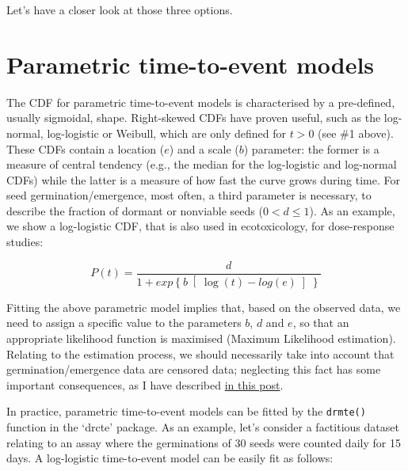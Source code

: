 \documentclass[
]{book}
\begin{document}
Let's have a closer look at those three options.

\hypertarget{parametric-time-to-event-models}{%
\section{Parametric time-to-event models}\label{parametric-time-to-event-models}}

The CDF for parametric time-to-event models is characterised by a pre-defined, usually sigmoidal, shape. Right-skewed CDFs have proven useful, such as the log-normal, log-logistic or Weibull, which are only defined for \(t > 0\) (see \#1 above). These CDFs contain a location (\(e\)) and a scale (\(b\)) parameter: the former is a measure of central tendency (e.g., the median for the log-logistic and log-normal CDFs) while the latter is a measure of how fast the curve grows during time. For seed germination/emergence, most often, a third parameter is necessary, to describe the fraction of dormant or nonviable seeds (\(0 < d \leq 1\)). As an example, we show a log-logistic CDF, that is also used in ecotoxicology, for dose-response studies:

\[P(t) = \frac{d}{1 + exp\left\{ b \right[ \log(t) - log(e)\left] \right\}}\]

Fitting the above parametric model implies that, based on the observed data, we need to assign a specific value to the parameters \(b\), \(d\) and \(e\), so that an appropriate likelihood function is maximised (Maximum Likelihood estimation). Relating to the estimation process, we should necessarily take into account that germination/emergence data are censored data; neglecting this fact has some important consequences, as I have described \href{https://www.statforbiology.com/2021/stat_drcte_2-methods/}{in this post}.

In practice, parametric time-to-event models can be fitted by the \texttt{drmte()} function in the `drcte' package. As an example, let's consider a factitious dataset relating to an assay where the germinations of 30 seeds were counted daily for 15 days. A log-logistic time-to-event model can be easily fit as follows:
\end{document}
